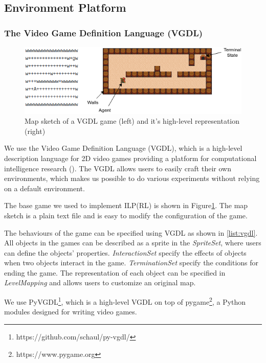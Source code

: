 \subsection{Environment Platform}
\subsubsection{The Video Game Definition Language (VGDL)}

\begin{figure}[!ht!b]
\centering
\includegraphics[width=1\textwidth]{./figures/env_sample}
\caption{Map sketch of a VGDL game (left) and it's high-level representation (right)} 
\label{VGDL_sample}
\end{figure}

We use the Video Game Definition Language (VGDL), which is a high-level description language for 2D video games providing a platform for computational intelligence research (\cite{Schaul2013}).
The VGDL allows users to easily craft their own environments, 
which makes us possible to do various experiments without relying on a default environment.

The base game we used to implement ILP(RL) is shown in Figure\ref{VGDL_sample}.
The map sketch is a plain text file and is easy to modify the configuration of the game.



The behaviours of the game can be specified using VGDL as shown in \ref{list:vgdl}. 
All objects in the games can be described as a sprite in the \textit{SpriteSet}, where users can define the objects' properties.
\textit{InteractionSet} specify the effects of objects when two objects interact in the game.
\textit{TerminationSet} specify the conditions for ending the game.
The representation of each object can be specified in \textit{LevelMapping} and allows users to customize an original map.

We use PyVGDL\footnote{https://github.com/schaul/py-vgdl/}, which is a high-level VGDL on top of pygame\footnote{https://www.pygame.org}, 
a Python modules designed for writing video games.

